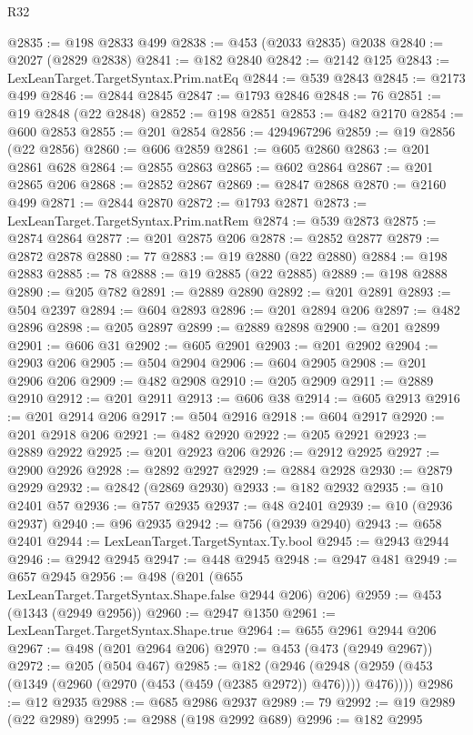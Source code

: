 \begin{lexlean}{R32}
\begin{coremodule}
@2835 := @198 @2833 @499
@2838 := @453 (@2033 @2835) @2038
@2840 := @2027 (@2829 @2838)
@2841 := @182 @2840
@2842 := @2142 @125
@2843 := LexLeanTarget.TargetSyntax.Prim.natEq
@2844 := @539 @2843
@2845 := @2173 @499
@2846 := @2844 @2845
@2847 := @1793 @2846
@2848 := 76
@2851 := @19 @2848 (@22 @2848)
@2852 := @198 @2851
@2853 := @482 @2170
@2854 := @600 @2853
@2855 := @201 @2854
@2856 := 4294967296
@2859 := @19 @2856 (@22 @2856)
@2860 := @606 @2859
@2861 := @605 @2860
@2863 := @201 @2861 @628
@2864 := @2855 @2863
@2865 := @602 @2864
@2867 := @201 @2865 @206
@2868 := @2852 @2867
@2869 := @2847 @2868
@2870 := @2160 @499
@2871 := @2844 @2870
@2872 := @1793 @2871
@2873 := LexLeanTarget.TargetSyntax.Prim.natRem
@2874 := @539 @2873
@2875 := @2874 @2864
@2877 := @201 @2875 @206
@2878 := @2852 @2877
@2879 := @2872 @2878
@2880 := 77
@2883 := @19 @2880 (@22 @2880)
@2884 := @198 @2883
@2885 := 78
@2888 := @19 @2885 (@22 @2885)
@2889 := @198 @2888
@2890 := @205 @782
@2891 := @2889 @2890
@2892 := @201 @2891
@2893 := @504 @2397
@2894 := @604 @2893
@2896 := @201 @2894 @206
@2897 := @482 @2896
@2898 := @205 @2897
@2899 := @2889 @2898
@2900 := @201 @2899
@2901 := @606 @31
@2902 := @605 @2901
@2903 := @201 @2902
@2904 := @2903 @206
@2905 := @504 @2904
@2906 := @604 @2905
@2908 := @201 @2906 @206
@2909 := @482 @2908
@2910 := @205 @2909
@2911 := @2889 @2910
@2912 := @201 @2911
@2913 := @606 @38
@2914 := @605 @2913
@2916 := @201 @2914 @206
@2917 := @504 @2916
@2918 := @604 @2917
@2920 := @201 @2918 @206
@2921 := @482 @2920
@2922 := @205 @2921
@2923 := @2889 @2922
@2925 := @201 @2923 @206
@2926 := @2912 @2925
@2927 := @2900 @2926
@2928 := @2892 @2927
@2929 := @2884 @2928
@2930 := @2879 @2929
@2932 := @2842 (@2869 @2930)
@2933 := @182 @2932
@2935 := @10 @2401 @57
@2936 := @757 @2935
@2937 := @48 @2401
@2939 := @10 (@2936 @2937)
@2940 := @96 @2935
@2942 := @756 (@2939 @2940)
@2943 := @658 @2401
@2944 := LexLeanTarget.TargetSyntax.Ty.bool
@2945 := @2943 @2944
@2946 := @2942 @2945
@2947 := @448 @2945
@2948 := @2947 @481
@2949 := @657 @2945
@2956 := @498 (@201 (@655 LexLeanTarget.TargetSyntax.Shape.false @2944 @206) @206)
@2959 := @453 (@1343 (@2949 @2956))
@2960 := @2947 @1350
@2961 := LexLeanTarget.TargetSyntax.Shape.true
@2964 := @655 @2961 @2944 @206
@2967 := @498 (@201 @2964 @206)
@2970 := @453 (@473 (@2949 @2967))
@2972 := @205 (@504 @467)
@2985 := @182
    (@2946 (@2948 (@2959 (@453 (@1349 (@2960 (@2970 (@453 (@459 (@2385 @2972)) @476)))) @476))))
@2986 := @12 @2935
@2988 := @685 @2986 @2937
@2989 := 79
@2992 := @19 @2989 (@22 @2989)
@2995 := @2988 (@198 @2992 @689)
@2996 := @182 @2995

\end{coremodule}
\end{lexlean}
